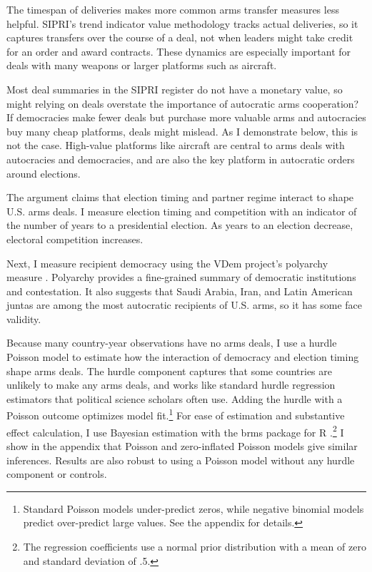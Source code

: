 \documentclass[12pt]{article}
\begin{document}
The timespan of deliveries makes more common arms transfer measures less helpful.
SIPRI's trend indicator value methodology tracks actual deliveries, so it captures transfers over the course of a deal, not when leaders might take credit for an order and award contracts.
These dynamics are especially important for deals with many weapons or larger platforms such as aircraft. 


Most deal summaries in the SIPRI register do not have a monetary value, so might relying on deals overstate the importance of autocratic arms cooperation? 
If democracies make fewer deals but purchase more valuable arms and autocracies buy many cheap platforms, deals might mislead. 
As I demonstrate below, this is not the case. 
High-value platforms like aircraft are central to arms deals with autocracies and democracies, and are also the key platform in autocratic orders around elections. 


The argument claims that election timing and partner regime interact to shape U.S. arms deals. 
I measure election timing and competition with an indicator of the number of years to a presidential election. 
As years to an election decrease, electoral competition increases. 


Next, I measure recipient democracy using the VDem project's polyarchy measure \citep{Coppedgeetal2008}. 
Polyarchy provides a fine-grained summary of democratic institutions and contestation.
It also suggests that Saudi Arabia, Iran, and Latin American juntas are among the most autocratic recipients of U.S. arms, so it has some face validity.  


Because many country-year observations have no arms deals, I use a hurdle Poisson model to estimate how the interaction of democracy and election timing shape arms deals.
The hurdle component captures that some countries are unlikely to make any arms deals, and works like standard hurdle regression estimators that political science scholars often use. 
Adding the hurdle with a Poisson outcome optimizes model fit.\footnote{Standard Poisson models under-predict zeros, while negative binomial models predict over-predict large values. See the appendix for details.} 
For ease of estimation and substantive effect calculation, I use Bayesian estimation with the brms package for \textsf{R} \citep{Buerkner2017}.\footnote{The regression coefficients use a normal prior distribution with a mean of zero and standard deviation of .5.}
I show in the appendix that Poisson and zero-inflated Poisson models give similar inferences. 
Results are also robust to using a Poisson model without any hurdle component or controls.
\end{document}
